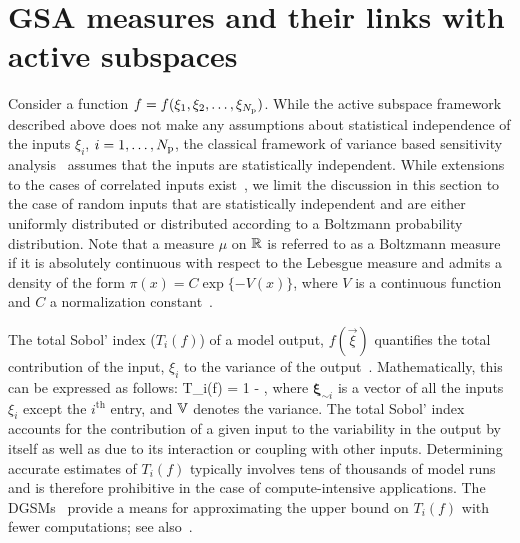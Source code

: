   

\section{GSA measures and their links with active subspaces}
\label{sub:gsa}
Consider a function $f = f(\xi_1, \xi_2, \ldots, \xi_{N_\text{p}})$. 
While the active subspace framework described above does not make any assumptions
about statistical independence of the inputs $\xi_i$, $i = 1, \ldots, {N_\text{p}}$, 
the classical 
framework of variance based sensitivity analysis~\cite{Sobol:2001, Saltelli:2010} 
assumes that the inputs
are statistically independent. While extensions to the cases 
of correlated inputs exist~\cite{Borgonovo:2007,Li:2010,Jacques:2006,Xu:2007,Hart:2017},
 we limit the discussion in this section to the
case of random inputs that are statistically independent and are 
either uniformly distributed or
distributed according to a Boltzmann probability distribution.
Note that a measure $\mu$
on $\mathbb{R}$ is referred to as a Boltzmann measure if it is 
absolutely continuous with respect to the Lebesgue measure  
and admits a density  of the form $\pi(x) = C \exp\{-V(x)\}$,
where $V$ is a continuous function and $C$ a normalization 
constant~\cite{Lamboni:2013}.


The total Sobol' index ($T_i(f)$) of a model output, $f(\vec\xi)$ quantifies
the total contribution of the input, $\xi_i$ to the variance of the
output~\cite{Sobol:2001}. Mathematically, this can be expressed as follows:
%
\be
T_i(f) = 1 - 
,
\label{eq:total}
\ee
%
where $\bm{\xi}_{\sim i}$ is a vector of all the inputs $\xi_i$ except the  $i^\text{th}$ entry, and $\mathbb{V}$ denotes the variance. The total Sobol' index accounts
for the contribution of a given input to the variability in the output by itself
as well as due to its interaction or coupling with other inputs. 
Determining accurate estimates of $T_i(f)$ typically involves tens of
thousands of model runs and is therefore prohibitive in the case of
compute-intensive applications. The DGSMs~\cite{Sobol:2009} provide a means for
approximating the upper bound on $T_i(f)$ with fewer computations; see 
also~\cite{Vohra:2018}. 

